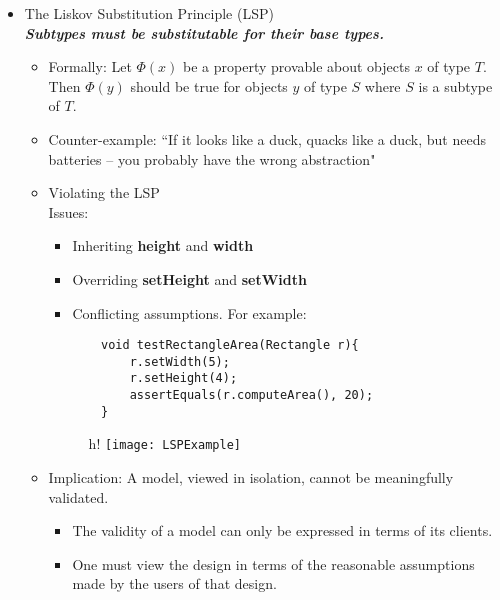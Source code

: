 \begin{itemize}
	\item The Liskov Substitution Principle (LSP)\\
	\textbf{\emph{Subtypes must be substitutable for their base types.}}
	\begin{itemize}
		\item Formally: Let $ \Phi(x) $ be a property provable about objects $ x $ of type $ T $. Then $ \Phi(y) $ should be true for objects $ y $ of type $ S $ where $ S $ is a subtype of $ T $.
		\item Counter-example: ``If it looks like a duck, quacks like a duck, but needs batteries – you probably have the wrong abstraction"
		\item Violating the LSP\\
		Issues:\\
		\begin{minipage}{0.6\textwidth}
			\begin{itemize}
				\item Inheriting \textbf{height} and \textbf{width}
				\item Overriding \textbf{setHeight} and \textbf{setWidth}
				\item Conflicting assumptions. For example:
				\begin{Verbatim}
	void testRectangleArea(Rectangle r){
		r.setWidth(5);
		r.setHeight(4);
		assertEquals(r.computeArea(), 20);
	}
				\end{Verbatim}
			\end{itemize}
		\end{minipage}
			\begin{figure}{h!}
			\texttt{[image: LSPExample]}
			\end{figure}

		\item Implication: A model, viewed in isolation, cannot be meaningfully validated.
		\begin{itemize}
			\item The validity of a model can only be expressed in terms of its clients.
			\item One must view the design in terms of the reasonable assumptions made by
			the users of that design.
		\end{itemize}
	\end{itemize}


\end{itemize}
